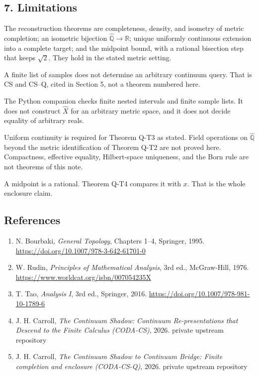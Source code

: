 \documentclass[
  11pt,
]{article}
\providecommand{\tightlist}{%
  \setlength{\itemsep}{0pt}\setlength{\parskip}{0pt}}
\begin{document}
\subsection{7. Limitations}\label{limitations}

The reconstruction theorems are completeness, density, and isometry of metric completion; an isometric bijection \(\widehat{\mathbb{Q}}\to\mathbb{R}\); unique uniformly continuous extension into a complete target; and the midpoint bound, with a rational bisection step that keeps \(\sqrt{2}\). They hold in the stated metric setting.

A finite list of samples does not determine an arbitrary continuum query. That is CS and CS--Q, cited in Section 5, not a theorem numbered here.

The Python companion checks finite nested intervals and finite sample lists. It does not construct \(\widehat{X}\) for an arbitrary metric space, and it does not decide equality of arbitrary reals.

Uniform continuity is required for Theorem Q-T3 as stated. Field operations on \(\widehat{\mathbb{Q}}\) beyond the metric identification of Theorem Q-T2 are not proved here. Compactness, effective equality, Hilbert-space uniqueness, and the Born rule are not theorems of this note.

A midpoint is a rational. Theorem Q-T4 compares it with \(x\). That is the whole enclosure claim.

\subsection{References}\label{references}

\begin{enumerate}
\def\labelenumi{\arabic{enumi}.}
\tightlist
\item
  N. Bourbaki, \emph{General Topology}, Chapters 1--4, Springer, 1995. \url{https://doi.org/10.1007/978-3-642-61701-0}
\item
  W. Rudin, \emph{Principles of Mathematical Analysis}, 3rd ed., McGraw-Hill, 1976. \url{https://www.worldcat.org/isbn/007054235X}
\item
  T. Tao, \emph{Analysis I}, 3rd ed., Springer, 2016. \url{https://doi.org/10.1007/978-981-10-1789-6}
\item
  J. H. Carroll, \emph{The Continuum Shadow: Continuum Re-presentations that Descend to the Finite Calculus (CODA-CS)}, 2026. private upstream repository
\item
  J. H. Carroll, \emph{The Continuum Shadow to Continuum Bridge: Finite completion and enclosure (CODA-CS-Q)}, 2026. private upstream repository
\end{enumerate}
\end{document}
